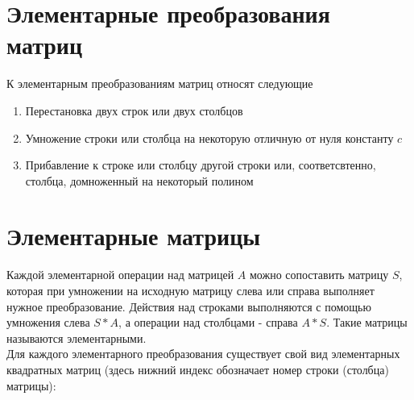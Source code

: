 \documentclass[14pt, a4paper]{extreport}
\begin{document}
	\section{Элементарные преобразования матриц}
	К элементарным преобразованиям матриц относят следующие
	\begin{enumerate}
		\item Перестановка двух строк или двух столбцов
		\item Умножение строки или столбца на некоторую отличную от нуля константу $c$
		\item Прибавление к строке или столбцу другой строки или, соответсвтенно, столбца, домноженный на некоторый полином
	\end{enumerate}
	\section{Элементарные матрицы}
		Каждой элементарной операции над матрицей $A$ можно сопоставить матрицу $S$,
		которая при умножении на исходную матрицу слева или справа выполняет нужное
		преобразование. Действия над строками выполняются с помощью умножения слева
		$S*A$, а операции над столбцами - справа $A*S$. Такие матрицы называются
		элементарными.\\
		Для каждого элементарного преобразования существует свой вид элементарных квадратных матриц
		(здесь нижний индекс обозначает номер строки (столбца) матрицы):
\end{document}
